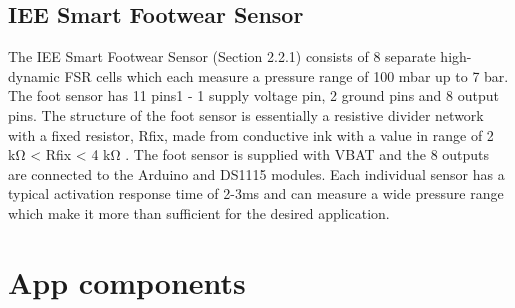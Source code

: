 \subsection{IEE Smart Footwear Sensor}

The IEE Smart Footwear Sensor (Section 2.2.1) consists of 8 separate high-dynamic FSR
cells which each measure a pressure range of 100 mbar up to 7 bar. The foot sensor has
11 pins1
- 1 supply voltage pin, 2 ground pins and 8 output pins. The structure of the
foot sensor is essentially a resistive divider network with a fixed resistor, Rfix, made from
conductive ink with a value in range of 2 kΩ < Rfix < 4 kΩ . The foot sensor is supplied
with VBAT and the 8 outputs are connected to the Arduino and DS1115 modules. Each
individual sensor has a typical activation response time of 2-3ms and can measure a wide
pressure range which make it more than sufficient for the desired application.


\section{App components}
